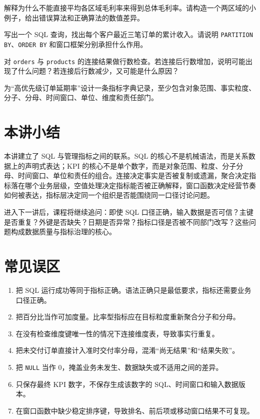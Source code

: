 \documentclass[UTF8,fontset=fandol,openany,zihao=-4]{ctexbook}
\begin{document}
\begin{exercise}
解释为什么不能直接平均各区域毛利率来得到总体毛利率。请构造一个两区域的小例子，给出错误算法和正确算法的数值差异。
\end{exercise}

\begin{exercise}
写出一个 SQL 查询，找出每个客户最近三笔订单的累计收入。请说明 \texttt{PARTITION BY}、\texttt{ORDER BY} 和窗口框架分别承担什么作用。
\end{exercise}

\begin{exercise}
对 \texttt{orders} 与 \texttt{products} 的连接结果做行数检查。若连接后行数增加，说明可能出现了什么问题？若连接后行数减少，又可能是什么原因？
\end{exercise}

\begin{exercise}
为“高优先级订单延期率”设计一条指标字典记录，至少包含对象范围、事实粒度、分子、分母、时间窗口、单位、维度和责任部门。
\end{exercise}

\section*{本讲小结}

本讲建立了 SQL 与管理指标之间的联系。SQL 的核心不是机械语法，而是关系数据上的声明式表达；KPI 的核心不是单个数字，而是对象范围、粒度、分子分母、时间窗口、单位和责任的组合。连接决定事实是否被复制或遗漏，聚合决定指标落在哪个业务层级，空值处理决定指标能否被正确解释，窗口函数决定经营节奏如何被表达，指标层决定同一个组织是否能围绕同一口径讨论问题。

进入下一讲后，课程将继续追问：即使 SQL 口径正确，输入数据是否可信？主键是否重复？外键是否缺失？日期是否异常？指标口径是否被不同部门改写？这些问题构成数据质量与指标治理的核心。

\section*{常见误区}

\begin{enumerate}
  \item 把 SQL 运行成功等同于指标正确。语法正确只是最低要求，指标还需要业务口径正确。
  \item 把百分比当作可加度量。比率型指标应在目标粒度重新聚合分子和分母。
  \item 在没有检查维度键唯一性的情况下连接维度表，导致事实行重复。
  \item 把未交付订单直接计入准时交付率分母，混淆“尚无结果”和“结果失败”。
  \item 把 \texttt{NULL} 当作 0，掩盖业务未发生、数据缺失或不适用之间的差异。
  \item 只保存最终 KPI 数字，不保存生成该数字的 SQL、时间窗口和输入数据版本。
  \item 在窗口函数中缺少稳定排序键，导致排名、前后项或移动窗口结果不可复现。
\end{enumerate}
\end{document}
